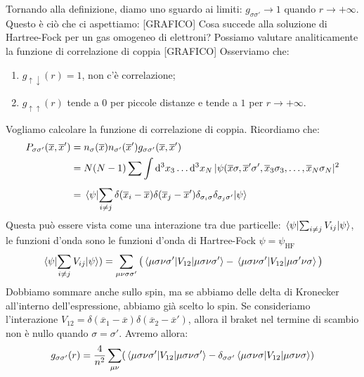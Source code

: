 Tornando alla definizione, diamo uno sguardo ai limiti: $g_{\sigma\sigma'}\rightarrow 1$ quando $r\rightarrow +\infty$. Questo è ciò che ci aspettiamo:
[GRAFICO]
Cosa succede alla soluzione di Hartree-Fock per un gas omogeneo di elettroni? Possiamo valutare analiticamente la funzione di correlazione di coppia
[GRAFICO]
Osserviamo che:
\begin{enumerate}
    \item $g_{\uparrow\downarrow}(r)=1$, non c'è correlazione;
    \item $g_{\uparrow\uparrow}(r)$ tende a $0$ per piccole distanze e tende a $1$ per $r\rightarrow+\infty$.
\end{enumerate}
Vogliamo calcolare la funzione di correlazione di coppia. Ricordiamo che:
\begin{equation*}
    \begin{aligned}
    P_{\sigma\sigma'}(\overline x, \overline{x}') &= n_\sigma(\overline x)n_{\sigma'}(\overline{x}')g_{\sigma\sigma'}(\overline x, \overline{x}') \\
    & = N(N-1)\sum_{}\int \dd[3]{x_3}\dots\dd[3]{x_N}|\psi(\overline x \sigma, \overline{x}'\sigma', \overline{x}_3\sigma_3,\dots,\overline{x}_N\sigma_N|^2 \\
    & = \mel{\psi}{\sum_{i\neq j}\delta(\overline{x}_i-\overline{x})\delta(\overline{x}_j-\overline{x}')\delta_{\sigma_i\sigma}\delta_{\sigma_j\sigma'}}{\psi}
    \end{aligned}
\end{equation*}
Questa può essere vista come una interazione tra due particelle: $\mel{\psi}{\sum_{i\neq j}V_{ij}}{\psi}$, le funzioni d'onda sono le funzioni d'onda di Hartree-Fock $\psi=\psi_{\text{HF}}$
\begin{equation*}
    \mel{\psi}{\sum_{i\neq j}V_{ij}}{\psi})=\sum_{\mu\nu\sigma\sigma'}\big(\mel{\mu\sigma\nu\sigma'}{V_{12}}{\mu\sigma\nu\sigma'}-\mel{\mu\sigma\nu\sigma'}{V_{12}}{\mu\sigma'\nu\sigma}\big)
\end{equation*}
Dobbiamo sommare anche sullo spin, ma se abbiamo delle delta di Kronecker all'interno dell'espressione, abbiamo già scelto lo spin.
Se consideriamo l'interazione $V_{12}=\delta(\overline{x}_1-\overline x)\delta(\overline{x}_2-\overline{x}')$, allora il braket nel termine di scambio non è nullo quando $\sigma=\sigma'$.
Avremo allora:
\begin{equation*}
    g_{\sigma\sigma'}(r)=\frac{4}{n^2}\sum_{\mu\nu}(\mel{\mu\sigma\nu\sigma'}{V_{12}}{\mu\sigma\nu\sigma'}-\delta_{\sigma\sigma'}\mel{\mu\sigma\nu\sigma}{V_{12}}{\mu\sigma\nu\sigma})
\end{equation*}
